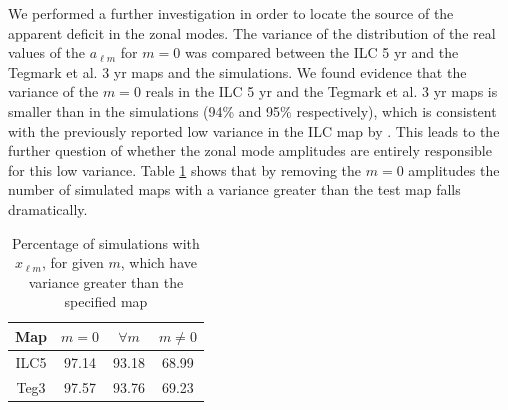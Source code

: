 \documentclass[useAMS,usenatbib,usegraphicx]{mn2e}
\def\l{{\ell}}
\def\lm{{\l m}}
\def\alm{a_{\lm}}
\begin{document}
We performed a further investigation in order to locate the source
of the apparent deficit in the zonal modes. The variance of the
distribution of the real values of the $\alm$ for $m=0$ was compared
between the ILC 5 yr and the Tegmark et al. 3 yr maps and the
simulations. We found evidence that  the variance of the $m = 0$
reals in the ILC 5 yr and the Tegmark et al. 3 yr maps is smaller
than in the simulations (94\% and 95\% respectively), which is
consistent with the previously reported low variance in the ILC map
by \cite{b7}. This leads to the further question of whether the
zonal mode  amplitudes are entirely responsible for this low
variance. Table \ref{TABvar} shows that by removing the $m = 0$
 amplitudes the number of simulated maps with a variance
greater than the test map falls dramatically.

\begin{table}
\begin{center}
  \begin{tabular}{|c|c|c|c|}
    \hline \hline
    Map & $m = 0$ & $\forall m$ & $m\ne 0$    \\ \hline
    ILC5  &  97.14  & 93.18 &    68.99             \\
    Teg3  &  97.57  & 93.76 &    69.23            \\  \hline
    \hline
  \end{tabular}
  \caption{Percentage of simulations with $x_{\lm}$, for given $m$, which have variance greater than the specified map}
  \label{TABvar}
\end{center}
\end{table}
\end{document}
